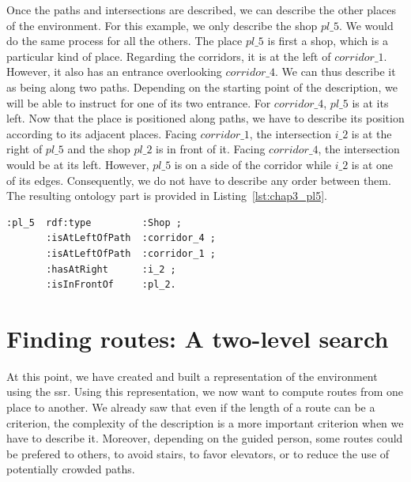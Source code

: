 Once the paths and intersections are described, we can describe the other places of the environment. For this example, we only describe the shop $pl\_5$. We would do the same process for all the others. The place $pl\_5$ is first a shop,  which is a particular kind of place. Regarding the corridors, it is at the left of $corridor\_1$. However, it also has an entrance overlooking $corridor\_4$. We can thus describe it as being along two paths. Depending on the starting point of the description, we will be able to instruct for one of its two entrance. For $corridor\_4$, $pl\_5$ is at its left. Now that the place is positioned along paths, we have to describe its position according to its adjacent places. Facing $corridor\_1$, the intersection $i\_2$ is at the right of $pl\_5$ and the shop $pl\_2$ is in front of it. Facing $corridor\_4$, the intersection would be at its left. However, $pl\_5$ is on a side of the corridor while $i\_2$ is at one of its edges. Consequently, we do not have to describe any order  between them. The resulting ontology part is provided in Listing~\ref{lst:chap3_pl5}.

\begin{lstlisting}[frame=single, basicstyle=\scriptsize\ttfamily, label={lst:chap3_pl5}, caption={Description of the shop pl\_5 using the \acrshort{ssr} in the OWL language using the Turle syntax.},captionpos=b, style=OwlTurtle_indiv]
:pl_5  rdf:type         :Shop ;
       :isAtLeftOfPath  :corridor_4 ;
       :isAtLeftOfPath  :corridor_1 ;
       :hasAtRight      :i_2 ;
       :isInFrontOf     :pl_2.
\end{lstlisting}

\section{Finding routes: A two-level search}

At this point, we have created and built a representation of the environment using the \acrfull{ssr}. Using this representation, we now want to compute routes from one place to another. We already saw that even if the length of a route can be a criterion, the complexity of the description is a more important criterion when we have to describe it. Moreover, depending on the guided person, some routes could be prefered to others, to avoid stairs, to favor elevators, or to reduce the use of potentially crowded paths.

